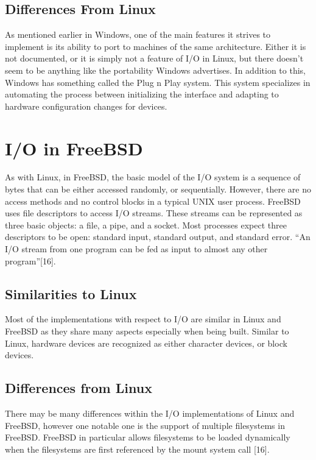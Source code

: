 \documentclass[onecolumn, draftclsnofoot,10pt, compsoc]{IEEEtran}
\begin{document}
\subsection{Differences From Linux}
As mentioned earlier in Windows, one of the main features it strives to implement is its ability to port to machines of the same architecture. Either it is not documented, or it is simply not a feature of I/O in Linux, but there doesn’t seem to be anything like the portability Windows advertises. In addition to this, Windows has something called the Plug n Play system. This system specializes in automating the process between initializing the interface and adapting to hardware configuration changes for devices. 

\section{I/O in FreeBSD}

As with Linux, in FreeBSD, the basic model of the I/O system is a sequence of bytes that can be either accessed randomly, or sequentially. However, there are no access methods and no control blocks in a typical UNIX user process. FreeBSD uses file descriptors to access I/O streams. These streams can be represented as three basic objects: a file, a pipe, and a socket. Most processes expect three descriptors to be open: standard input, standard output, and standard error. “An I/O stream from one program can be fed as input to almost any other program”[16].





\subsection{Similarities to Linux}
Most of the implementations with respect to I/O are similar in Linux and FreeBSD as they share many aspects especially when being built. Similar to Linux, hardware devices are recognized as either character devices, or block devices. 


\subsection{Differences from Linux}

There may be many differences within the I/O implementations of Linux and FreeBSD, however one notable one is the support of multiple filesystems in FreeBSD. FreeBSD in particular allows filesystems to be loaded dynamically when the filesystems are first referenced by the mount system call [16].
\end{document}
